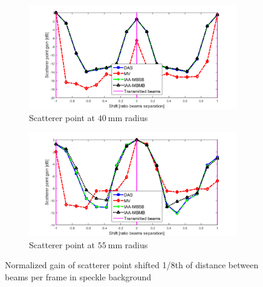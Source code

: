 \begin{figure}[ht]
    \centering
    \begin{subfigure}[t]{\linewidth}
        \includegraphics[width=\linewidth]{./images/results/1/loss_vs_shift_40mm_speckle.png}
        \caption{Scatterer point at $40~$mm radius}
    \end{subfigure}
    \quad
    \begin{subfigure}[t]{\linewidth}
        \includegraphics[width=\linewidth]{./images/results/1/loss_vs_shift_55mm_speckle.png}
        \caption{Scatterer point at $55~$mm radius}
    \end{subfigure}
	\caption{Normalized gain of scatterer point shifted 1/8th of distance between beams per frame in speckle background}
	\label{fig:loss_vs_shift_speckle}
\end{figure}

